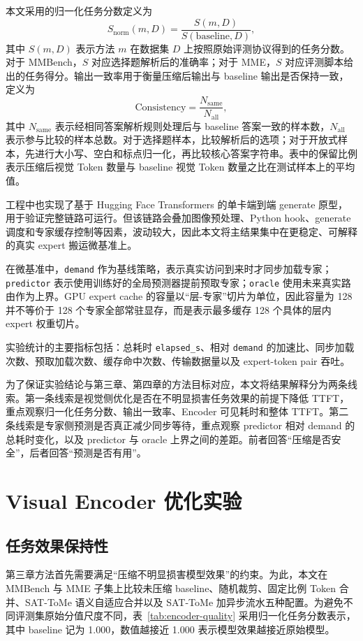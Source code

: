 本文采用的归一化任务分数定义为
\begin{equation}
S_{\mathrm{norm}}(m,D)=\frac{S(m,D)}{S(\mathrm{baseline},D)},
\end{equation}
其中 $S(m,D)$ 表示方法 $m$ 在数据集 $D$ 上按照原始评测协议得到的任务分数。对于 MMBench，$S$ 对应选择题解析后的准确率；对于 MME，$S$ 对应评测脚本给出的任务得分。输出一致率用于衡量压缩后输出与 baseline 输出是否保持一致，定义为
\begin{equation}
\mathrm{Consistency}=\frac{N_{\mathrm{same}}}{N_{\mathrm{all}}},
\end{equation}
其中 $N_{\mathrm{same}}$ 表示经相同答案解析规则处理后与 baseline 答案一致的样本数，$N_{\mathrm{all}}$ 表示参与比较的样本总数。对于选择题样本，比较解析后的选项；对于开放式样本，先进行大小写、空白和标点归一化，再比较核心答案字符串。表中的保留比例表示压缩后视觉 Token 数量与 baseline 视觉 Token 数量之比在测试样本上的平均值。

工程中也实现了基于 Hugging Face Transformers 的单卡端到端 generate 原型，用于验证完整链路可运行。但该链路会叠加图像预处理、Python hook、generate 调度和专家缓存控制等因素，波动较大，因此本文将主结果集中在更稳定、可解释的真实 expert 搬运微基准上。

在微基准中，\texttt{demand} 作为基线策略，表示真实访问到来时才同步加载专家；\texttt{predictor} 表示使用训练好的全局预测器提前预取专家；\texttt{oracle} 使用未来真实路由作为上界。GPU expert cache 的容量以“层-专家”切片为单位，因此容量为 128 并不等价于 128 个专家全部常驻显存，而是表示最多缓存 128 个具体的层内 expert 权重切片。

实验统计的主要指标包括：总耗时 \texttt{elapsed\_s}、相对 \texttt{demand} 的加速比、同步加载次数、预取加载次数、缓存命中次数、传输数据量以及 expert-token pair 吞吐。

为了保证实验结论与第三章、第四章的方法目标对应，本文将结果解释分为两条线索。第一条线索是视觉侧优化是否在不明显损害任务效果的前提下降低 TTFT，重点观察归一化任务分数、输出一致率、Encoder 可见耗时和整体 TTFT。第二条线索是专家侧预测是否真正减少同步等待，重点观察 predictor 相对 demand 的总耗时变化，以及 predictor 与 oracle 上界之间的差距。前者回答“压缩是否安全”，后者回答“预测是否有用”。


\section{Visual Encoder 优化实验}
\subsection{任务效果保持性}
第三章方法首先需要满足“压缩不明显损害模型效果”的约束。为此，本文在 MMBench\cite{liu2024mmbench} 与 MME\cite{fu2023mme} 子集上比较未压缩 baseline、随机裁剪、固定比例 Token 合并、SAT-ToMe 语义自适应合并以及 SAT-ToMe 加异步流水五种配置。为避免不同评测集原始分值尺度不同，表~\ref{tab:encoder-quality} 采用归一化任务分数表示，其中 baseline 记为 1.000，数值越接近 1.000 表示模型效果越接近原始模型。

